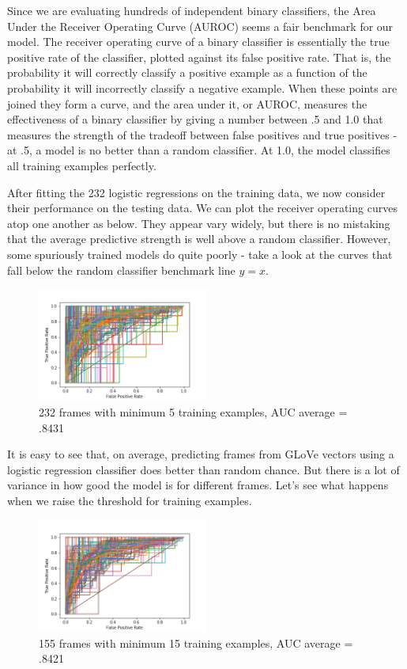 \documentclass[11pt,a4paper]{article}
\begin{document}
Since we are evaluating hundreds of independent binary classifiers, the Area Under the Receiver Operating Curve (AUROC) seems a fair benchmark for our model. The receiver operating curve of a binary classifier is essentially the true positive rate of the classifier, plotted against its false positive rate. That is, the probability it will correctly classify a positive example as a function of the probability it will incorrectly classify a negative example. When these points are joined they form a curve, and the area under it, or AUROC, measures the effectiveness of a binary classifier by giving a number between .5 and 1.0 that measures the strength of the tradeoff between false positives and true positives - at .5, a model is no better than a random classifier. At 1.0, the model classifies all training examples perfectly. 

After fitting the 232 logistic regressions on the training data, we now consider their performance on the testing data. We can plot the receiver operating curves atop one another as below. They appear vary widely, but there is no mistaking that the average predictive strength is well above a random classifier. However, some spuriously trained models do quite poorly - take a look at the curves that fall below the random classifier benchmark line $y = x$.  

\begin{figure}
	\centering
	\includegraphics[width=0.5\textwidth]{AUC_plot5.png}
	\caption{\label{fig:frog} 232 frames with minimum 5 training examples, AUC average = .8431}
\end{figure}

It is easy to see that, on average, predicting frames from GLoVe vectors using a logistic regression classifier does better than random chance. But there is a lot of variance in how good the model is for different frames. Let's see what happens when we raise the threshold for training examples.

\begin{figure}
	\centering
	\includegraphics[width=0.5\textwidth]{auc_plot15.png}
	\caption{\label{fig:frog} 155 frames with minimum 15 training examples, AUC average = .8421}
\end{figure}
\end{document}
